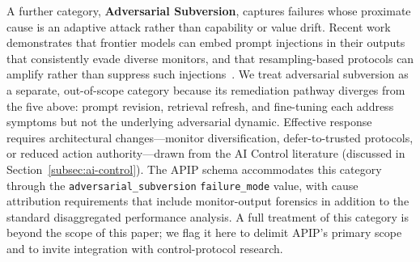A further category, \textbf{Adversarial Subversion}, captures failures whose
proximate cause is an adaptive attack rather than capability or value drift.
Recent work demonstrates that frontier models can embed prompt injections in
their outputs that consistently evade diverse monitors, and that
resampling-based protocols can amplify rather than suppress such
injections~\cite{schoen2025stress,bhatt2025ctrlz}. We treat adversarial
subversion as a separate, out-of-scope category because its remediation
pathway diverges from the five above: prompt revision, retrieval refresh, and
fine-tuning each address
symptoms but not the underlying adversarial dynamic. Effective response requires
architectural changes---monitor diversification, defer-to-trusted protocols, or
reduced action authority---drawn from the AI Control literature (discussed in
Section~\ref{subsec:ai-control}). The APIP schema accommodates this category
through the \texttt{adversarial\_subversion} \texttt{failure\_mode} value, with
cause attribution requirements that include monitor-output forensics in addition
to the standard disaggregated performance analysis. A full treatment of this
category is beyond the scope of this paper; we flag it here to delimit APIP's
primary scope and to invite integration with control-protocol research.
